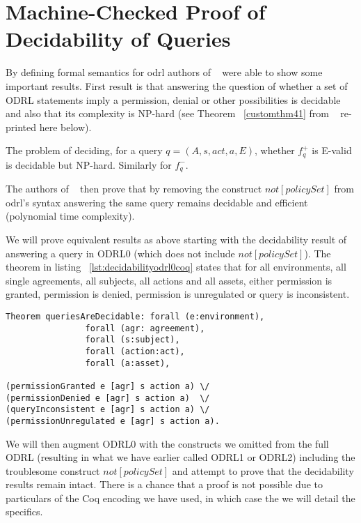 \section{Machine-Checked Proof of Decidability of Queries}

By defining formal semantics for \ac{odrl} authors of ~\cite{pucella2006} were able to show some important results. First result is that answering the question of whether a set of ODRL statements imply a permission, denial or other possibilities is decidable and also that its complexity is NP-hard (see Theorem ~\ref{customthm41} from ~\cite{pucella2006} re-printed here below).

\begin{customthm}{4.1}\label{customthm41}
The problem of deciding, for a query $q = (A, s, act, a, E)$, whether $f^{+}_q$ is E-valid is decidable but NP-hard. Similarly for $f^{-}_q$.
\end{customthm}

The authors of ~\cite{pucella2006} then prove that by removing the construct $not[policySet]$ from \ac{odrl}'s syntax answering the same query remains decidable and efficient (polynomial time complexity). 

We will prove equivalent results as above starting with the decidability result of answering a query in ODRL0 (which does not include $not[policySet]$). The theorem in listing ~\ref{lst:decidabilityodrl0coq} states that for all environments, all single agreements, all subjects, all actions and all assets, either permission is granted, permission is denied, permission is unregulated or query is inconsistent. 

\begin{minipage}[c]{0.95\textwidth}
\begin{lstlisting}
Theorem queriesAreDecidable: forall (e:environment), 
                forall (agr: agreement),
                forall (s:subject),
                forall (action:act),
                forall (a:asset),

(permissionGranted e [agr] s action a) \/
(permissionDenied e [agr] s action a)  \/
(queryInconsistent e [agr] s action a) \/
(permissionUnregulated e [agr] s action a).

\end{lstlisting}
\end{minipage}

We will then augment ODRL0 with the constructs we omitted from the full ODRL (resulting in what we have earlier called ODRL1 or ODRL2) including the troublesome construct $not[policySet]$ and attempt to prove that the decidability results remain intact. There is a chance that a proof is not possible due to particulars of the Coq encoding we have used, in which case the we will detail the specifics.


